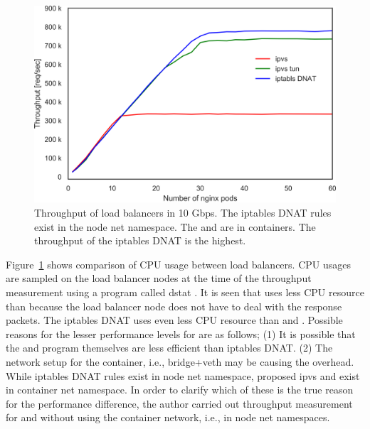 \begin{figure}[h]
  \centering
  \includegraphics[width=0.8\columnwidth]{Figs/ipvs_l3dsr_10g}
  \par\bigskip
  \centering
  \begin{minipage}{0.9\columnwidth}
    \caption[Throughput of load balancers in 10 Gbps]{
      Throughput of load balancers in 10 Gbps.
      The iptables DNAT rules exist in the node net namespace.
      The  and  are in containers.
      The throughput of the iptables DNAT is the highest.
    }
    \label{fig:ipvs_l3dsr_10g}
  \end{minipage}
\end{figure}

Figure~\ref{fig:ipvs_l3dsr_10g} shows comparison of CPU usage between load balancers.
CPU usages are sampled on the load balancer nodes at the time of the throughput measurement using a program called dstat \cite{wieers2019dstat}.
It is seen that  uses less CPU resource than  because the load balancer node does not have to deal with the response packets.
The iptables DNAT uses even less CPU resource than  and .
Possible reasons for the lesser performance levels for  are as follows;
(1) It is possible that the  and  program themselves are less efficient than iptables DNAT.
(2) The network setup for the container, i.e., bridge+veth may be causing the overhead.
While iptables DNAT rules exist in node net namespace, proposed ipvs and  exist in container net namespace.
In order to clarify which of these is the true reason for the performance difference, the author carried out throughput measurement for  and  without using the container network, i.e., in node net namespaces.

